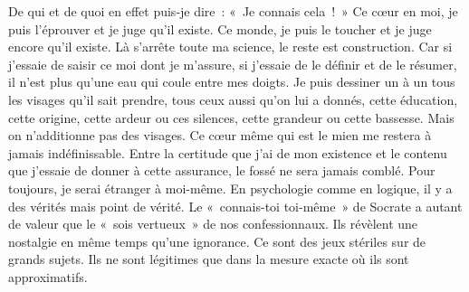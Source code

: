 \documentclass{book}
\begin{document}
De qui et de quoi en effet puis‑je dire : « Je connais cela ! » Ce cœur en moi, je puis l'éprouver et je juge qu'il existe. Ce monde, je puis le toucher et je juge encore qu'il existe. Là s'arrête toute ma science, le reste est construction. Car si j'essaie de saisir ce moi dont je m'assure, si j'essaie de le définir et de le résumer, il n'est plus qu'une eau qui coule entre mes doigts. Je puis dessiner un à un tous les visages qu'il sait prendre, tous ceux aussi qu'on lui a donnés, cette éducation, cette origine, cette ardeur ou ces silences, cette grandeur ou cette bassesse. Mais on n'additionne pas des visages. Ce cœur même qui est le mien me restera à jamais indéfinissable. Entre la certitude que j'ai de mon existence et le contenu que j'essaie de donner à cette assurance, le fossé ne sera jamais comblé. Pour toujours, je serai étranger à moi-même. En psychologie comme en logique, il y a des vérités mais point de vérité. Le « connais-toi toi-même » de Socrate a autant de valeur que le « sois vertueux » de nos confessionnaux. Ils révèlent une nostalgie en même temps qu'une ignorance. Ce sont des jeux stériles sur de grands sujets. Ils ne sont légitimes que dans la mesure exacte où ils sont approximatifs.
\end{document}
